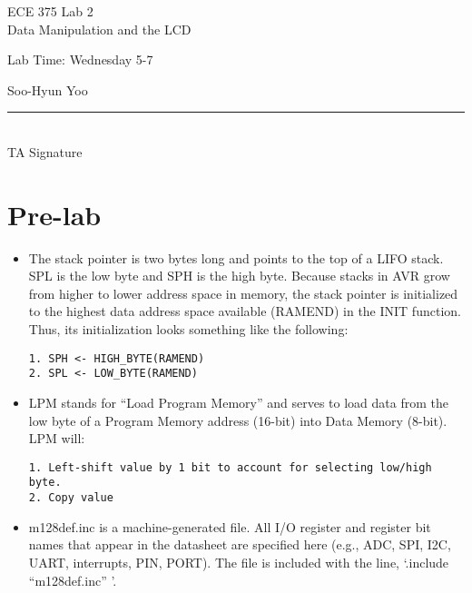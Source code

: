 \documentclass[12pt,letterpaper]{article}
\begin{document}
\begin{titlepage}
    \vspace*{4cm}
    \begin{flushright}
    {\huge
        ECE 375 Lab 2\\[1cm]
    }
    {\large
        Data Manipulation and the LCD
    }
    \end{flushright}
    \begin{flushleft}
    Lab Time: Wednesday 5-7
    \end{flushleft}
    \begin{flushright}
    Soo-Hyun Yoo

    \vfill
    \rule{5in}{.5mm}\\
    TA Signature
    \end{flushright}

\end{titlepage}

\section{Pre-lab}

\begin{itemize}
	\item The stack pointer is two bytes long and points to the top of a LIFO
		stack. SPL is the low byte and SPH is the high byte. Because stacks in
		AVR grow from higher to lower address space in memory, the stack
		pointer is initialized to the highest data address space available
		(RAMEND) in the INIT function. Thus, its initialization looks something
		like the following:

		\begin{verbatim}
1. SPH <- HIGH_BYTE(RAMEND)
2. SPL <- LOW_BYTE(RAMEND)
		\end{verbatim}

	\item LPM stands for ``Load Program Memory'' and serves to load data from
		the low byte of a Program Memory address (16-bit) into Data Memory
		(8-bit). LPM will:

		\begin{verbatim}
1. Left-shift value by 1 bit to account for selecting low/high byte.
2. Copy value
		\end{verbatim}

	\item m128def.inc is a machine-generated file. All I/O register and
		register bit names that appear in the datasheet are specified here
		(e.g., ADC, SPI, I2C, UART, interrupts, PIN, PORT). The file is
		included with the line, `.include ``m128def.inc'' '.

\end{itemize}
\end{document}
